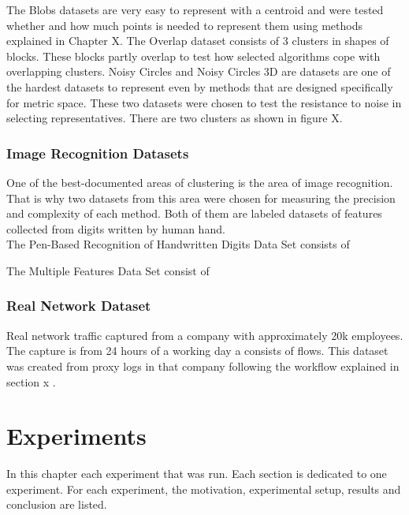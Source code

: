 \documentclass[thesis=B,english]{FITthesis}[2012/10/20]
\begin{document}
The Blobs datasets are very easy to represent with a centroid and were tested whether and how much points is needed to represent them using methods explained in Chapter X.  The Overlap dataset consists of 3 clusters in shapes of blocks.
These blocks partly overlap to test how selected algorithms cope with overlapping clusters. Noisy Circles and Noisy Circles 3D are datasets are one of the hardest datasets to represent even by methods that are designed specifically for metric space.
These two datasets were chosen to test the resistance to noise in selecting representatives.
There are two clusters as shown in figure X. 

\subsection{Image Recognition Datasets}
One of the best-documented areas of clustering is the area of image recognition.
That is why two datasets from this area were chosen for measuring the precision and complexity of each method. Both of them are labeled datasets of features collected from digits written by human hand. \\

The Pen-Based Recognition of Handwritten Digits Data Set \cite{dua1998pendigit} consists of 

The Multiple Features Data Set \cite{dua1998pendigit} consist of  

\subsection{Real Network Dataset}
Real network traffic captured from a company with approximately 20k employees.
The capture is from 24 hours of a working day a consists of  flows.
This dataset was created from proxy logs in that company following the workflow explained in section x . \\


\chapter{Experiments}

In this chapter each experiment that was run.
Each section is dedicated to one experiment.
For each experiment, the motivation, experimental setup, results and conclusion are listed.
\end{document}
